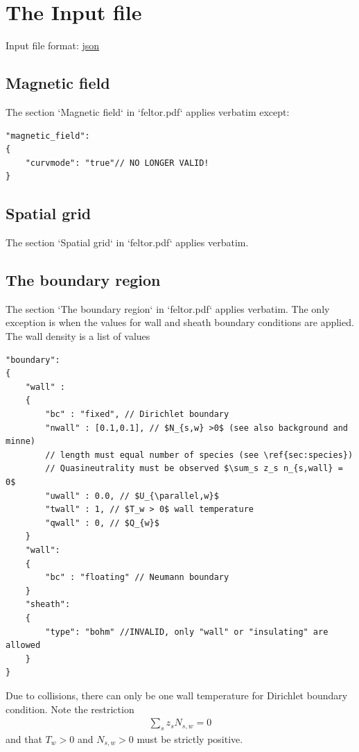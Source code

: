 \section{The Input file} \label{sec:input_file}
Input file format: \href{https://en.wikipedia.org/wiki/JSON}{json}

\subsection{Magnetic field} \label{sec:geometry_file}
The section `Magnetic field` in `feltor.pdf` applies verbatim except:

\begin{verbatim}
"magnetic_field":
{
    "curvmode": "true"// NO LONGER VALID!
}
\end{verbatim}

\subsection{Spatial grid} \label{sec:spatial}
The section `Spatial grid` in `feltor.pdf` applies verbatim.
\subsection{The boundary region} \label{sec:boundary}
The section `The boundary region` in `feltor.pdf` applies verbatim.
The only exception is when the values for wall and sheath boundary conditions are applied.
The wall density is a list of values
\begin{verbatim}
"boundary":
{
    "wall" :
    {
        "bc" : "fixed", // Dirichlet boundary
        "nwall" : [0.1,0.1], // $N_{s,w} >0$ (see also background and minne)
        // length must equal number of species (see \ref{sec:species})
        // Quasineutrality must be observed $\sum_s z_s n_{s,wall} = 0$
        "uwall" : 0.0, // $U_{\parallel,w}$
        "twall" : 1, // $T_w > 0$ wall temperature
        "qwall" : 0, // $Q_{w}$
    }
    "wall":
    {
        "bc" : "floating" // Neumann boundary
    }
    "sheath":
    {
        "type": "bohm" //INVALID, only "wall" or "insulating" are allowed
    }
}
\end{verbatim}
Due to collisions, there can only be one wall temperature for Dirichlet boundary condition.
Note the restriction
\begin{align}
    \sum_s z_s N_{s,w} = 0
\end{align}
and that $T_{w}>0$ and $N_{s,w}>0$ must be strictly positive.


